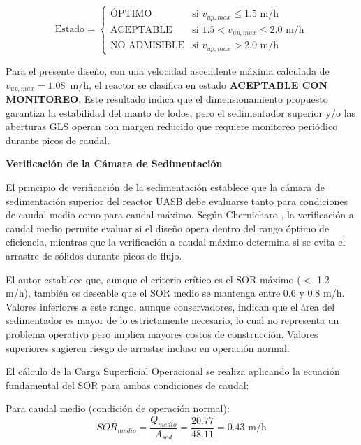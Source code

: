\documentclass[12pt,a4paper]{article}
\begin{document}
\begin{equation}
\text{Estado} = \begin{cases}
    \text{ÓPTIMO} & \text{si } v_{up,max} \leq 1.5 \text{ m/h} \\
    \text{ACEPTABLE} & \text{si } 1.5 < v_{up,max} \leq 2.0 \text{ m/h} \\
    \text{NO ADMISIBLE} & \text{si } v_{up,max} > 2.0 \text{ m/h}
\end{cases}
\end{equation}

Para el presente diseño, con una velocidad ascendente máxima calculada de $v_{up,max} = 1.08$~m/h, el reactor se clasifica en estado \textbf{ACEPTABLE CON MONITOREO}. Este resultado indica que el dimensionamiento propuesto garantiza la estabilidad del manto de lodos, pero el sedimentador superior y/o las aberturas GLS operan con margen reducido que requiere monitoreo periódico durante picos de caudal.

\textbf{Verificación de la Cámara de Sedimentación}

El principio de verificación de la sedimentación establece que la cámara de sedimentación superior del reactor UASB debe evaluarse tanto para condiciones de caudal medio como para caudal máximo. Según Chernicharo \cite{chernicharo2007}, la verificación a caudal medio permite evaluar si el diseño opera dentro del rango óptimo de eficiencia, mientras que la verificación a caudal máximo determina si se evita el arrastre de sólidos durante picos de flujo.

El autor establece que, aunque el criterio crítico es el SOR máximo ($<$ 1.2 m/h), también es deseable que el SOR medio se mantenga entre 0.6 y 0.8 m/h. Valores inferiores a este rango, aunque conservadores, indican que el área del sedimentador es mayor de lo estrictamente necesario, lo cual no representa un problema operativo pero implica mayores costos de construcción. Valores superiores sugieren riesgo de arrastre incluso en operación normal.

El cálculo de la Carga Superficial Operacional se realiza aplicando la ecuación fundamental del SOR para ambas condiciones de caudal:

Para caudal medio (condición de operación normal):
\begin{equation}
SOR_{medio} = \frac{Q_{medio}}{A_{sed}} = \frac{20.77}{48.11} = 0.43 \text{ m/h}
\end{equation}
\end{document}
